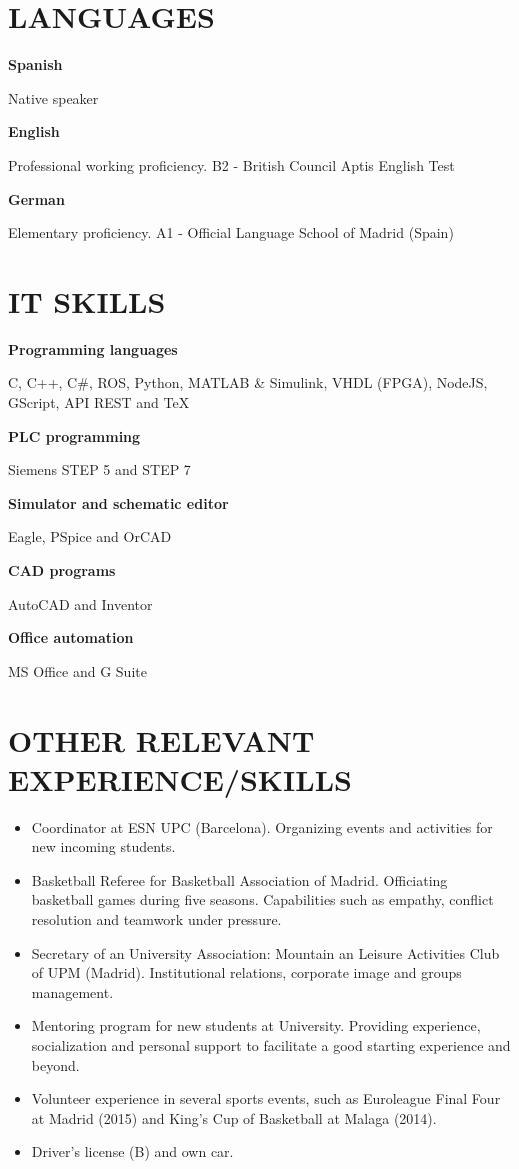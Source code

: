 \documentclass[10pt,a4paper,oneside]{book}
\newcommand{\sepspace}{\vspace*{0pt}}		%
\newcommand{\NewPart}[2]{\section*{\uppercase{#1} #2}}
\newcommand{\LanguageEntry}[2]{\noindent\ignorespaces
\textbf{#1}	\par
\noindent \small #2 \par
}
\newcommand{\ITSkillEntry}[2]{\noindent\ignorespaces
\textbf{#1}	\par
\noindent \small #2 \par
}
\begin{document}
\NewPart{Languages}{}
\LanguageEntry{Spanish}{Native speaker}
\sepspace
\LanguageEntry{English}{Professional working proficiency.  B2 - British Council Aptis English Test}
\sepspace
\LanguageEntry{German}{Elementary proficiency. A1 - Official Language School of Madrid (Spain)}

\NewPart{IT skills}{}
\ITSkillEntry{Programming languages}{C,  C++, C\#, ROS, Python, MATLAB \& Simulink, VHDL (FPGA), NodeJS, GScript, API REST and \TeX}
\sepspace
\ITSkillEntry{PLC programming}{Siemens STEP 5 and STEP 7}
\sepspace
\ITSkillEntry{Simulator and schematic editor}{Eagle, PSpice and OrCAD}
\sepspace
\ITSkillEntry{CAD programs}{AutoCAD and Inventor}
\sepspace
\ITSkillEntry{Office automation}{MS Office and G Suite}

\NewPart{Other Relevant Experience/Skills}{}
\begin{itemize}
\item Coordinator at ESN UPC (Barcelona). Organizing events and activities for new incoming students.
\item Basketball Referee for Basketball Association of Madrid. Officiating basketball games during five seasons. Capabilities such as empathy, conflict resolution and teamwork under pressure.
\item Secretary of an University Association: Mountain an Leisure Activities Club of UPM (Madrid). Institutional relations, corporate image and groups management.
\item Mentoring program for new students at University. Providing experience, socialization and personal support to facilitate a good starting experience and beyond.
\item Volunteer experience in several sports events, such as Euroleague Final Four at Madrid (2015) and King’s Cup of Basketball at Malaga (2014).
\item Driver's license (B) and own car.
\end{itemize}
\end{document}
